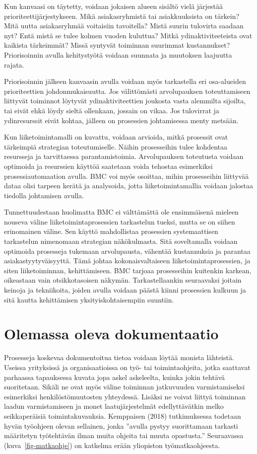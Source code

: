\documentclass[
  finnish,
  letterpaper,
  DIV=11,
  numbers=noendperiod,
  oneside]{scrreprt}
\begin{document}
Kun kanvaasi on täytetty, voidaan jokaisen alueen sisältö vielä
järjestää prioriteettijärjestykseen. Mikä asiakasryhmistä tai
asiakkuuksista on tärkein? Mitä uutta asiakasryhmää voitaisiin
tavoitella? Mistä suurin tulovirta saadaan nyt? Entä mistä se tulee
kolmen vuoden kuluttua? Mitkä ydinaktiviteeteista ovat kaikista
tärkeimmät? Missä syntyvät toiminnan suurimmat kustannukset?
Priorisoinnin avulla kehitystyötä voidaan suunnata ja muutoksen
laajuutta rajata.

Priorisoinnin jälkeen kanvaasin avulla voidaan myös tarkastella eri
osa-alueiden prioriteettien johdonmukaisuutta. Jos välittömästi
arvolupauksen toteuttamiseen liittyvät toiminnot löytyvät
ydinaktiviteettien joukosta vasta alemmilta sijoilta, tai eivät ehkä
löydy sieltä ollenkaan, jossain on vikaa. Jos tulovirrat ja
ydinresurssit eivät kohtaa, jälleen on prosessien johtamisessa menty
metsään.

Kun liiketoimintamalli on kuvattu, voidaan arvioida, mitkä prosessit
ovat tärkeimpiä strategian toteutumiselle. Näihin prosesseihin tulee
kohdentaa resursseja ja tarvittaessa parantamistoimia. Arvolupauksen
toteutusta voidaan optimoida ja resurssien käyttöä saatetaan voida
tehostaa esimerkiksi prosessiautomaation avulla. BMC voi myös osoittaa,
mihin prosesseihin liittyvää dataa olisi tarpeen kerätä ja analysoida,
jotta liiketoimintamallia voidaan jalostaa tiedolla johtamisen avulla.

Tunnettuudestaan huolimatta BMC ei välttämättä ole ensimmäisenä mieleen
nouseva väline liiketoimintaprosessien tarkastelun tueksi, mutta se on
siihen erinomainen väline. Sen käyttö mahdollistaa prosessien
systemaattisen tarkastelun nimenomaan strategian näkökulmasta. Sitä
soveltamalla voidaan optimoida prosesseja tukemaan arvolupausta,
vähentää kustannuksia ja parantaa asiakastyytyväisyyttä. Tämä johtaa
kokonaisvaltaiseen liiketoimintaprosessien, ja siten liiketoiminnan,
kehittämiseen. BMC tarjoaa prosesseihin kuitenkin karkean, oikeastaan
vain otsikkotasoisen näkymän. Tarkastellaankin seuraavaksi joitain
keinoja ja tekniikoita, joiden avulla voidaan päästä kiinni prosessien
kulkuun ja sitä kautta kehittämisen yksityiskohtaisempiin suuntiin.

\section{Olemassa oleva
dokumentaatio}\label{olemassa-oleva-dokumentaatio}

Prosesseja koskevaa dokumentoitua tietoa voidaan löytää monista
lähteistä. Useissa yrityksissä ja organisaatioissa on työ- tai
toimintaohjeita, jotka saattavat parhaassa tapauksessa kuvata jopa askel
askeleelta, kuinka jokin tehtävä suoritetaan. Sikäli ne ovat myös väline
toiminnan jatkuvuuden varmistamiseksi esimerkiksi henkilöstömuutosten
yhteydessä. Lisäksi ne voivat liittyä toiminnan laadun varmistamiseen ja
monet laatujärjestelmät edellyttävätkin melko seikkaperäisiä
toimintakuvauksia. Kemppaisen (2018) tutkimuksessa todetaan hyvän
työohjeen olevan sellainen, jonka ''avulla pystyy suorittamaan tarkasti
määritetyn työtehtävän ilman muita ohjeita tai muuta opastusta.''
Seuraavassa (kuva~\ref{fig-matkaohje}) on katkelma erään yliopiston
työmatkaohjeesta.
\end{document}
